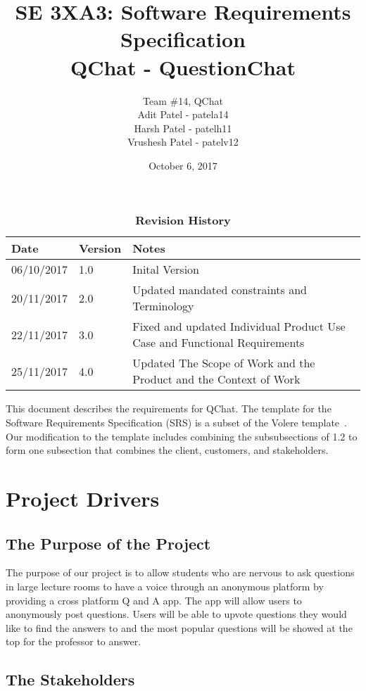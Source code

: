\documentclass[12pt, titlepage]{article}
\title{SE 3XA3: Software Requirements Specification\\QChat - QuestionChat}
\author{Team \#14, QChat
		\\ Adit Patel - patela14
		\\ Harsh Patel - patelh11
		\\ Vrushesh Patel - patelv12
}
\date{October 6, 2017}
\begin{document}
\maketitle

\tableofcontents
\listoftables

\begin{table}[bp]
\caption{\bf Revision History}
\begin{tabularx}{\textwidth}{p{3cm}p{2cm}X}
\toprule {\bf Date} & {\bf Version} & {\bf Notes}\\
\midrule
06/10/2017 & 1.0 & Inital Version\\
20/11/2017 & 2.0 & Updated mandated constraints and Terminology \\
22/11/2017 & 3.0 & Fixed and updated Individual Product Use Case and Functional Requirements\\
25/11/2017 & 4.0 & Updated The Scope of Work and the Product and the Context of Work\\
\bottomrule
\end{tabularx}
\end{table}

\newpage


This document describes the requirements for QChat.  The template for the Software
Requirements Specification (SRS) is a subset of the Volere
template~\citep{RobertsonAndRobertson2012}. Our modification to the template includes combining the subsubsections of 1.2 to form one subsection that combines the client, customers, and stakeholders.

\section{Project Drivers}

\subsection{The Purpose of the Project}
The purpose of our project is to allow students who are nervous to ask questions in large lecture rooms to have a voice through an anonymous platform by providing a cross platform Q and A app. The app will allow users to anonymously post questions. Users will be able to upvote questions they would like to find the answers to and the most popular questions will be showed at the top for the professor to answer.

\subsection{The Stakeholders}
\end{document}
